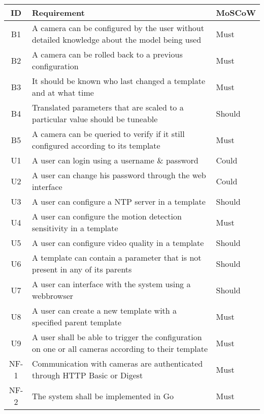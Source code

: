 \begin{table*}[h]
    \centering
    \begin{tabulary}{\linewidth}{CLL}
        \textbf{ID} & \textbf{Requirement} & \textbf{MoSCoW}
        \\ \hline %
        B1 & A camera can be configured by the user without detailed knowledge about the model being used & Must
        \\ \hline
        B2 & A camera can be rolled back to a previous configuration & Must
        \\ \hline
        B3 & It should be known who last changed a template and at what time & Must
        \\ \hline
        B4 & Translated parameters that are scaled to a particular value should be tuneable & Should
        \\ \hline
        B5 & A camera can be queried to verify if it still configured according to its template & Must
        \\ \hline
        U1 & A user can login using a username \& password & Could
        \\ \hline
        U2 & A user can change his password through the web interface & Could
        \\ \hline
        U3 & A user can configure a NTP server in a template & Should
        \\ \hline
        U4 & A user can configure the motion detection sensitivity in a template & Must
        \\ \hline
        U5 & A user can configure video quality in a template & Should
        \\ \hline
        U6 & A template can contain a parameter that is not present in any of its parents & Should
        \\ \hline
        U7 & A user can interface with the system using a webbrowser & Should
        \\ \hline
        U8 & A user can create a new template with a specified parent template & Must
        \\ \hline
        U9 & A user shall be able to trigger the configuration on one or all cameras according to their template & Must
        \\ \hline
        NF-1 & Communication with cameras are authenticated through HTTP Basic or Digest & Must
        \\ \hline
        NF-2 & The system shall be implemented in Go & Must

\end{tabulary}
\end{table*}

